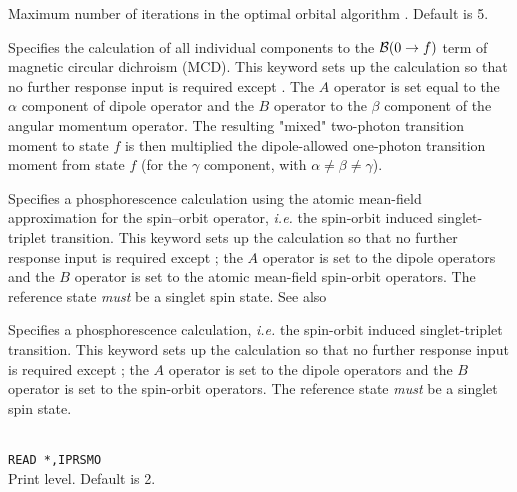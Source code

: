 \begin{description}
\item{}
Maximum number of iterations in the optimal
orbital algorithm
\cite{tuhjahjajpjjcp84}.
Default is 5.

\item{}
Specifies the calculation of all individual components to the
${\cal{B}}(0\to f)$ term of magnetic circular dichroism
(MCD).
This keyword sets up the calculation so that no further response input is required except .
The $A$ operator is set equal to the $\alpha$ component of dipole
operator and
the $B$ operator to the $\beta$ component of the angular momentum
operator. The resulting "mixed" two-photon transition moment to state $f$
is then multiplied the dipole-allowed one-photon transition moment
from state $f$ (for the $\gamma$ component, with $\alpha \neq \beta \neq \gamma$).
\cite{Coriani:MCDRSP}

\item{}
Specifies a phosphorescence calculation using
the atomic mean-field approximation for the spin--orbit operator, {\it i.e.\/}
the spin-orbit
induced singlet-triplet transition. This keyword sets up the
calculation so that no further response input is required except ; the
$A$ operator is set to the dipole operators and
the $B$ operator
is set to the atomic mean-field spin-orbit
operators.
The reference state {\em must} be a singlet spin state. See also 

\item{}
Specifies a phosphorescence calculation, {\it i.e.\/}
the spin-orbit
induced singlet-triplet transition. This keyword sets up the
calculation so that no further response input is required except ; the
$A$ operator is set to the dipole operators and
the $B$ operator
is set to the spin-orbit
operators. \cite{ovhapjhjajthjojcp97,haovbmaqc27}
The reference state {\em must} be a singlet spin state.

\item{}\\
\verb|READ *,IPRSMO|\\
Print level. Default is 2.


\end{description}
